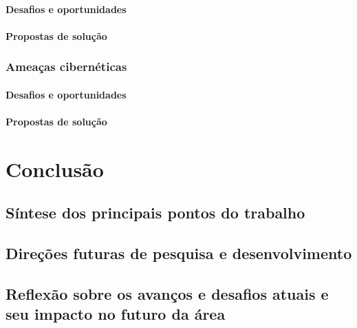 \subsubsection{Desafios e oportunidades}
\subsubsection{Propostas de solução}
\subsection{Ameaças cibernéticas}
\subsubsection{Desafios e oportunidades}
\subsubsection{Propostas de solução}

\chapter{Conclusão}
\section{Síntese dos principais pontos do trabalho}
\section{Direções futuras de pesquisa e desenvolvimento}
\section{Reflexão sobre os avanços e desafios atuais e seu impacto no futuro da área}
